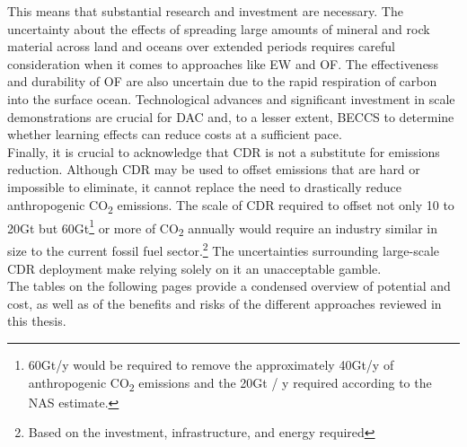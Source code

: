 This means that substantial research and investment are necessary. The uncertainty about the effects of spreading large amounts of mineral and rock material across land and oceans over extended periods requires careful consideration when it comes to approaches like EW and OF. The effectiveness and durability of OF are also uncertain due to the rapid respiration of carbon into the surface ocean. Technological advances and significant investment in scale demonstrations are crucial for DAC and, to a lesser extent, BECCS to determine whether learning effects can reduce costs at a sufficient pace.\\
Finally, it is crucial to acknowledge that CDR is not a substitute for emissions reduction. Although CDR may be used to offset emissions that are hard or impossible to eliminate, it cannot replace the need to drastically reduce anthropogenic CO\textsubscript{2} emissions. The scale of CDR required to offset not only 10 to 20Gt but 60Gt\footnote{60Gt/y would be required to remove the approximately 40Gt/y of anthropogenic CO\textsubscript{2} emissions and the 20Gt / y required according to the NAS estimate.} or more of CO\textsubscript{2} annually would require an industry similar in size to the current fossil fuel sector.\footnote{Based on the investment, infrastructure, and energy required} The uncertainties surrounding large-scale CDR deployment make relying solely on it an unacceptable gamble.
\\The tables on the following pages provide a condensed overview of potential and cost, as well as of the benefits and risks of the different approaches reviewed in this thesis.
\newpage


